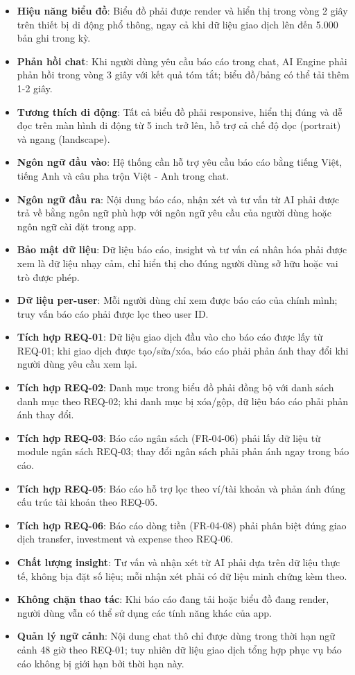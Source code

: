 \begin{itemize}
\item \textbf{Hiệu năng biểu đồ}: Biểu đồ phải được render và hiển thị trong vòng 2 giây trên thiết bị di động phổ thông, ngay cả khi dữ liệu giao dịch lên đến 5.000 bản ghi trong kỳ.
\item \textbf{Phản hồi chat}: Khi người dùng yêu cầu báo cáo trong chat, AI Engine phải phản hồi trong vòng 3 giây với kết quả tóm tắt; biểu đồ/bảng có thể tải thêm 1-2 giây.
\item \textbf{Tương thích di động}: Tất cả biểu đồ phải responsive, hiển thị đúng và dễ đọc trên màn hình di động từ 5 inch trở lên, hỗ trợ cả chế độ dọc (portrait) và ngang (landscape).
\item \textbf{Ngôn ngữ đầu vào}: Hệ thống cần hỗ trợ yêu cầu báo cáo bằng tiếng Việt, tiếng Anh và câu pha trộn Việt - Anh trong chat.
\item \textbf{Ngôn ngữ đầu ra}: Nội dung báo cáo, nhận xét và tư vấn từ AI phải được trả về bằng ngôn ngữ phù hợp với ngôn ngữ yêu cầu của người dùng hoặc ngôn ngữ cài đặt trong app.
\item \textbf{Bảo mật dữ liệu}: Dữ liệu báo cáo, insight và tư vấn cá nhân hóa phải được xem là dữ liệu nhạy cảm, chỉ hiển thị cho đúng người dùng sở hữu hoặc vai trò được phép.
\item \textbf{Dữ liệu per-user}: Mỗi người dùng chỉ xem được báo cáo của chính mình; truy vấn báo cáo phải được lọc theo user ID.
\item \textbf{Tích hợp REQ-01}: Dữ liệu giao dịch đầu vào cho báo cáo được lấy từ REQ-01; khi giao dịch được tạo/sửa/xóa, báo cáo phải phản ánh thay đổi khi người dùng yêu cầu xem lại.
\item \textbf{Tích hợp REQ-02}: Danh mục trong biểu đồ phải đồng bộ với danh sách danh mục theo REQ-02; khi danh mục bị xóa/gộp, dữ liệu báo cáo phải phản ánh thay đổi.
\item \textbf{Tích hợp REQ-03}: Báo cáo ngân sách (FR-04-06) phải lấy dữ liệu từ module ngân sách REQ-03; thay đổi ngân sách phải phản ánh ngay trong báo cáo.
\item \textbf{Tích hợp REQ-05}: Báo cáo hỗ trợ lọc theo ví/tài khoản và phản ánh đúng cấu trúc tài khoản theo REQ-05.
\item \textbf{Tích hợp REQ-06}: Báo cáo dòng tiền (FR-04-08) phải phân biệt đúng giao dịch transfer, investment và expense theo REQ-06.
\item \textbf{Chất lượng insight}: Tư vấn và nhận xét từ AI phải dựa trên dữ liệu thực tế, không bịa đặt số liệu; mỗi nhận xét phải có dữ liệu minh chứng kèm theo.
\item \textbf{Không chặn thao tác}: Khi báo cáo đang tải hoặc biểu đồ đang render, người dùng vẫn có thể sử dụng các tính năng khác của app.
\item \textbf{Quản lý ngữ cảnh}: Nội dung chat thô chỉ được dùng trong thời hạn ngữ cảnh 48 giờ theo REQ-01; tuy nhiên dữ liệu giao dịch tổng hợp phục vụ báo cáo không bị giới hạn bởi thời hạn này.
\end{itemize}
